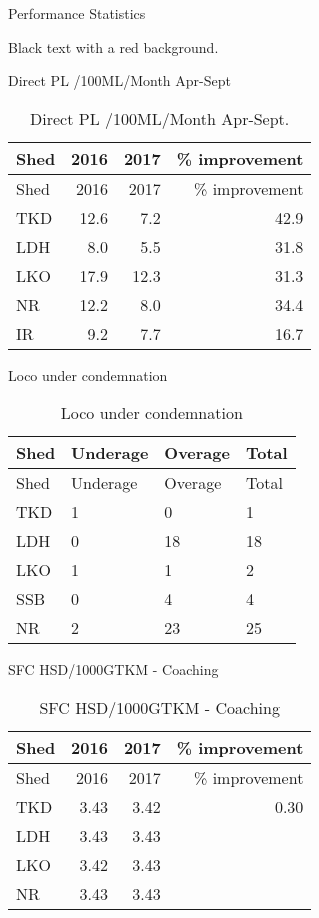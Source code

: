 \documentclass[
  ignorenonframetext,
]{beamer}
\begin{document}
\begin{frame}{Performance Statistics}
\protect\hypertarget{performance-statistics}{}
\begin{shaded}
Black text with a red background.
\end{shaded}


\begin{block}{Direct PL /100ML/Month Apr-Sept}
\protect\hypertarget{direct-pl-100mlmonth-apr-sept}{}
\begin{longtable}[]{@{}lrrr@{}}
\caption{Direct PL /100ML/Month Apr-Sept.}\tabularnewline
\toprule()
Shed & 2016 & 2017 & \% improvement \\
\midrule()
\endfirsthead
\toprule()
Shed & 2016 & 2017 & \% improvement \\
\midrule()
\endhead
TKD & 12.6 & 7.2 & 42.9 \\
LDH & 8.0 & 5.5 & 31.8 \\
LKO & 17.9 & 12.3 & 31.3 \\
NR & 12.2 & 8.0 & 34.4 \\
IR & 9.2 & 7.7 & 16.7 \\
\bottomrule()
\end{longtable}
\end{block}

\begin{block}{Loco under condemnation}
\protect\hypertarget{loco-under-condemnation}{}
\begin{longtable}[]{@{}llll@{}}
\caption{Loco under condemnation}\tabularnewline
\toprule()
Shed & Underage & Overage & Total \\
\midrule()
\endfirsthead
\toprule()
Shed & Underage & Overage & Total \\
\midrule()
\endhead
TKD & 1 & 0 & 1 \\
LDH & 0 & 18 & 18 \\
LKO & 1 & 1 & 2 \\
SSB & 0 & 4 & 4 \\
NR & 2 & 23 & 25 \\
\bottomrule()
\end{longtable}
\end{block}

\begin{block}{SFC HSD/1000GTKM - Coaching}
\protect\hypertarget{sfc-hsd1000gtkm---coaching}{}
\begin{longtable}[]{@{}lrrr@{}}
\caption{SFC HSD/1000GTKM - Coaching}\tabularnewline
\toprule()
Shed & 2016 & 2017 & \% improvement \\
\midrule()
\endfirsthead
\toprule()
Shed & 2016 & 2017 & \% improvement \\
\midrule()
\endhead
TKD & 3.43 & 3.42 & 0.30 \\
LDH & 3.43 & 3.43 & \\
LKO & 3.42 & 3.43 & \\
NR & 3.43 & 3.43 & \\
\bottomrule()
\end{longtable}
\end{block}


\end{frame}
\end{document}
